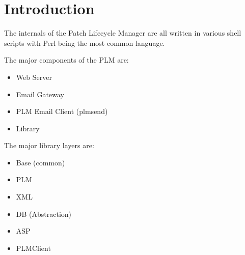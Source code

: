 \section {Introduction}
    The internals of the Patch Lifecycle Manager are all written in various
shell scripts with Perl being the most common language.

The major components of the PLM are:
\begin{itemize}
\item Web Server
\item Email Gateway
\item PLM Email Client (plmsend)
\item Library
\end{itemize}

The major library layers are:
\begin{itemize}
\item Base (common)
\item PLM 
\item XML
\item DB (Abstraction)
\item ASP
\item PLMClient
\end{itemize}
